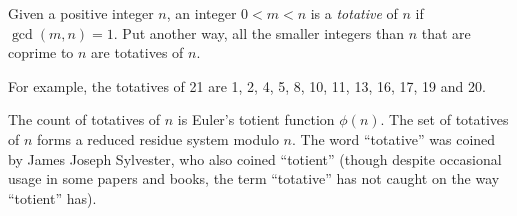 \documentclass[12pt]{article}
\begin{document}
Given a positive integer $n$, an integer $0 < m < n$ is a {\em totative} of $n$ if $\gcd(m, n) = 1$. Put another way, all the smaller integers than $n$ that are coprime to $n$ are totatives of $n$.

For example, the totatives of 21 are 1, 2, 4, 5, 8, 10, 11, 13, 16, 17, 19 and 20.

The count of totatives of $n$ is Euler's totient function $\phi(n)$. The set of totatives of $n$ forms a reduced residue system modulo $n$. The word ``totative'' was coined by James Joseph Sylvester, who also coined ``totient'' (though despite occasional usage in some papers and books, the term ``totative'' has not caught on the way ``totient'' has).
\end{document}
